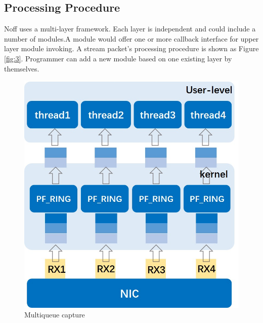 \documentclass[conference]{IEEEtran}
\begin{document}
\subsection{Processing Procedure}
Noff uses a multi-layer framework. Each layer is independent and could include a number of modules.A module would offer one or more callback interface for upper layer module invoking. A stream packet's processing procedure is shown as Figure \ref{fig:3}.
Programmer can add a new module based on one existing layer by themselves.
\begin{figure}
\begin{minipage}[t]{0.49\linewidth}
\flushleft
\includegraphics[width=\textwidth]{./picture/Figure1.jpg}
\caption{Multiqueue capture} 
\label{fig:1}
\end{minipage}
\begin{minipage}[t]{0.49\linewidth}
\flushright

\end{minipage}
\end{figure}
\end{document}
